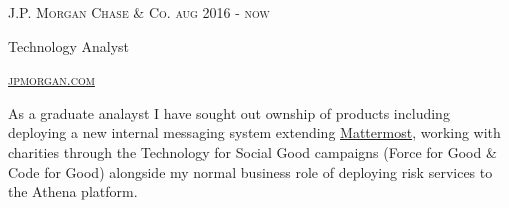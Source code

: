 {
  \textsc{\small{J.P. Morgan Chase \& Co. 
      \hfill
          {\raggedleft
              aug 2016 - now
          } \\
      }
  }
  {\raggedright\large {
   Technology Analyst 
  } \\}

  \textsc{\small\href{http://www.jpmorgan.com}{jpmorgan.com}}

  \normalsize{\raggedright
    As a graduate analayst I have sought out ownship of products including deploying a new internal messaging system extending \href{https://about.mattermost.com}{Mattermost}, working with charities through the Technology for Social Good campaigns (Force for Good \& Code for Good) alongside my normal business role of deploying risk services to the Athena platform.
  }
}